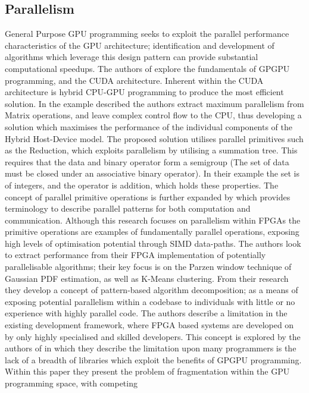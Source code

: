 \subsection{Parallelism}
General Purpose GPU programming seeks to exploit the parallel performance characteristics of the GPU
architecture; identification and development of algorithms which leverage this design pattern can
provide substantial computational speedups. The authors of \cite{papadrakakis2011new} explore the
fundamentals of GPGPU programming, and the CUDA architecture. Inherent within the CUDA architecture
is hybrid CPU-GPU programming to produce the most efficient solution. In the example described the
authors extract maximum parallelism from Matrix operations, and leave complex control flow to the
CPU, thus developing a solution which maximises the performance of the individual components of the
Hybrid Host-Device model. The proposed solution utilises parallel primitives such as the Reduction,
which exploits parallelism by utilising a summation tree. This requires that the data and binary
operator form a semigroup (The set of data must be closed under an associative binary operator). In
their example the set is of integers, and the operator is addition, which holds these properties.
The concept of parallel primitive operations is further expanded by \cite{nagarajan2011accelerating}
which provides terminology to describe parallel patterns for both computation and communication.
Although this research focuses on parallelism within FPGAs the primitive operations are examples of
fundamentally parallel operations, exposing high levels of optimisation potential through SIMD
data-paths. The authors look to extract performance from their FPGA implementation of potentially
parallelisable algorithms; their key focus is on the Parzen window technique of Gaussian PDF
estimation, as well as K-Means clustering. From their research they develop a concept of
pattern-based algorithm decomposition; as a means of exposing potential parallelism within a
codebase to individuals with little or no experience with highly parallel code.  The authors
describe a limitation in the existing development framework, where FPGA based systems are developed
on by only highly specialised and skilled developers. This concept is explored by the authors of
\cite{sengupta2007scan} in which they describe the limitation upon many programmers is
the lack of a breadth of libraries which exploit the benefits of GPGPU programming.  Within this
paper they present the problem of fragmentation within the GPU programming space, with competing
